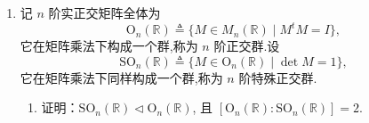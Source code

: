 \begin{enumerate}
\begin{proof}
    (2) $U_n$就是$\mathbb{C}^n$中所有的``旋转''，现在固定了一个点也就是锁定了一根轴，
    这时能进行的旋转就是像地球仪一样绕着这根轴在余下的$n-1$维子空间内转动，
    因此是$U_{n-1}$。用更正式的语言来表述就是，记固定的这个点为$v$，
    将全空间正交分解为$\mathbb{C}^n=\mathbb{C}v \oplus W$，
    设$A$属于$\operatorname{Stab}(v)$，则对于$w \in W$来说
    $v$垂直于$w$意味着$Av$垂直于$Aw$，从而有$Aw \in W$，
    这说明$A$是$\mathbb{C}v$上的单位阵和$W$上的线性变换$A|_W$的直和，$A|_W$无疑也是酉阵；
    反过来，$\mathbb{C}v$上的单位阵直和一个$W$上的酉阵也是$V$上的酉阵且固定$v$不动，
    因此$\operatorname{Stab}(v)$就是$\mathbb{C}v$上的单位阵直和$W$上的酉群，
    故同构于$W$上的酉群$U_{n-1}$。
\end{proof}
\item 记 $n$ 阶实正交矩阵全体为
\[
\mathrm{O}_n(\mathbb{R}) \triangleq \{M \in M_n(\mathbb{R}) \mid M^t M=I\},
\]
它在矩阵乘法下构成一个群,称为 $n$ 阶正交群.设
\[
\mathrm{SO}_n(\mathbb{R}) \triangleq \{M \in \mathrm{O}_n(\mathbb{R}) \mid \operatorname{det} M=1\},
\]
它在矩阵乘法下同样构成一个群,称为 $n$ 阶特殊正交群.
\begin{enumerate}[label=(\arabic*)]
\item 证明：$\mathrm{SO}_n(\mathbb{R}) \triangleleft \mathrm{O}_n(\mathbb{R})$,
且 $\left[\mathrm{O}_n(\mathbb{R}): \mathrm{SO}_n(\mathbb{R})\right]=2$.


\end{enumerate}
\end{enumerate}
